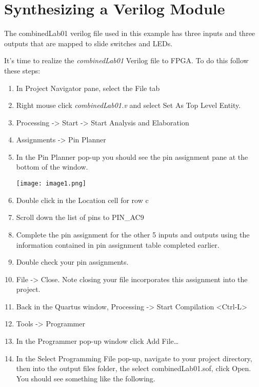 \chapter{Synthesizing a Verilog Module}
\graphicspath{ {./Lab00HowTo/howTo40 Performing Synthesis/Fig} }

The combinedLab01 verilog file used in this example has three inputs and
three outputs that are mapped to slide switches and LEDs.

It's time to realize the \emph{combinedLab01} Verilog file to FPGA. To
do this follow these steps:

\begin{enumerate}
        \def\labelenumi{\arabic{enumi}.}
    \item
        In Project Navigator pane, select the File tab
    \item
        Right mouse click \emph{combinedLab01.v} and select Set As Top Level
        Entity.
    \item
        Processing -\textgreater{} Start -\textgreater{} Start Analysis and
        Elaboration
    \item
        Assignments -\textgreater{} Pin Planner
    \item
        In the Pin Planner pop-up you should see the pin assignment pane at
        the bottom of the window.

        \texttt{[image: image1.png]}

    \item
        Double click in the Location cell for row c
    \item
        Scroll down the list of pins to PIN\_AC9
    \item
        Complete the pin assignment for the other 5 inputs and outputs using
        the information contained in pin assignment table completed earlier.
    \item
        Double check your pin assignments.
    \item
        File -\textgreater{} Close. Note closing your file incorporates this
        assignment into the project.
    \item
        Back in the Quartus window, Processing -\textgreater{} Start
        Compilation \textless Ctrl-L\textgreater{}
    \item
        Tools -\textgreater{} Programmer
    \item
        In the Programmer pop-up window click Add File\ldots{}
    \item
        In the Select Programming File pop-up, navigate to your project
        directory, then into the output files folder, the select
        combinedLab01.sof, click Open. You should see something like the
        following.


\end{enumerate}
